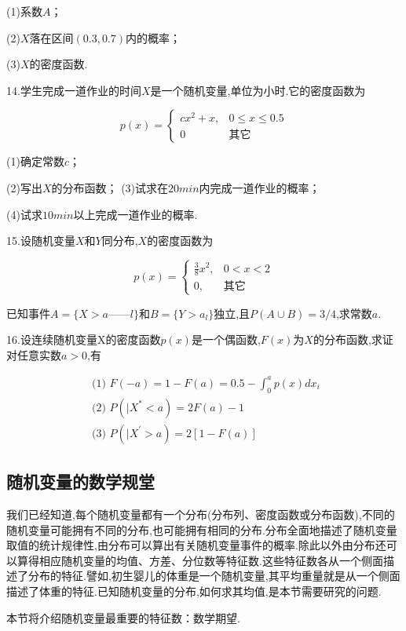 (1)系数$ A $；

(2)$ X $落在区间$ (0.3,0.7) $内的概率；

(3)$ X $的密度函数.

14.学生完成一道作业的时间$ X $是一个随机变量,单位为小时.它的密度函数为

\[ 
p(x)=\left\{\begin{array}{ll}
{c x^{2}+x,} & {0 \leqslant x \leqslant 0.5} \\ 
{0}&{\text{其它}}\end{array}\right.
\]

(1)确定常数$ c $；

(2)写出$ X $的分布函数；
(3)试求在$ 20min $内完成一道作业的概率；

(4)试求$ 10min $以上完成一道作业的概率.

15.设随机变量$ X $和$ Y $同分布,$ X $的密度函数为

\[ 
p(x)=\left\{\begin{array}{ll}
{\frac{3}{8} x^{2},} & {0<x<2} \\ 
{0,} & {\text{其它}}
\end{array}\right.
\]

已知事件$ A=\{X>a——l\} $和$ B=\{Y>a_l\} $独立,且$P(A \cup B)=3 / 4$,求常数$ a $.

16.设连续随机变量X的密度函数$ p(x) $是一个偶函数,$ F(x) $为$ X $的分布函数,求证对任意实数$ a>0 $,有

\[ 
\begin{array}{l}{\text { (1) } F(-a)=1-F(a)=0.5-\int_{0}^{a} p(x) d x_{i}} \\ {\text { (2) } P\left( | X^{*}<a\right)=2 F(a)-1} \\ {\text { (3) } P\left( | X^{\prime}>a\right)=2[1-F(a)]}\end{array}
\]

\subsection{随机变量的数学规堂}

我们已经知道,每个随机变量都有一个分布(分布列、密度函数或分布函数),不同的随机变量可能拥有不同的分布,也可能拥有相同的分布.分布全面地描述了随机变量取值的统计规律性,由分布可以算出有关随机变量事件的概率.除此以外由分布还可以算得相应随机变量的均值、方差、分位数等特征数.这些特征数各从一个侧面描述了分布的特征.譬如,初生婴儿的体重是一个随机变量,其平均重量就是从一个侧面描述了体重的特征.已知随机变量的分布,如何求其均值,是本节需要研究的问题.

本节将介绍随机变量最重要的特征数：数学期望.

